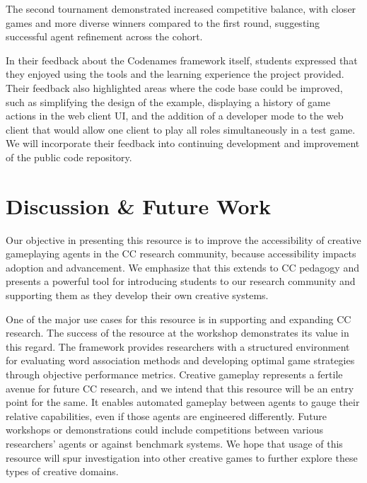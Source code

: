 \documentclass[phd,electronic,oneside,twosidetoc,letterpaper,chaptercenter,parttop,lof]{byumsphd}
\begin{document}
The second tournament demonstrated increased competitive balance, with closer games and more diverse winners compared to the first round, suggesting successful agent refinement across the cohort.

In their feedback about the Codenames framework itself, students expressed that they enjoyed using the tools and the learning experience the project provided. Their feedback also highlighted areas where the code base could be improved, such as simplifying the design of the example, displaying a history of game actions in the web client UI,  and the addition of a developer mode to the web client that would allow one client to play all roles simultaneously in a test game. We will incorporate their feedback into continuing development and improvement of the public code repository.

\section{Discussion \& Future Work}

Our objective in presenting this resource is to improve the accessibility of creative gameplaying agents in the CC research community, because accessibility impacts adoption and advancement. We emphasize that this extends to CC pedagogy and presents a powerful tool for introducing students to our research community and supporting them as they develop their own creative systems.

One of the major use cases for this resource is in supporting and expanding CC research. The success of the resource at the workshop demonstrates its value in this regard. The framework provides researchers with a structured environment for evaluating word association methods and developing optimal game strategies through objective performance metrics. Creative gameplay represents a fertile avenue for future CC research, and we intend that this resource will be an entry point for the same. It enables automated gameplay between agents to gauge their relative capabilities, even if those agents are engineered differently. Future workshops or demonstrations could include competitions between various researchers’ agents or against benchmark systems. We hope that usage of this resource will spur investigation into other creative games to further explore these types of creative domains.
\end{document}

